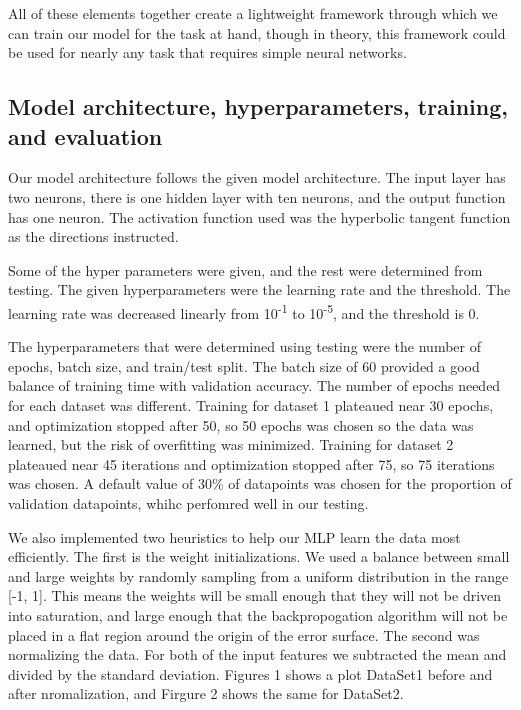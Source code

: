 \documentclass[letterpaper, 12pt]{article}
\begin{document}
All of these elements together create a lightweight framework through which we can train our model for the task at hand, though in theory, this framework could be used for nearly any task that requires simple neural networks.

\subsection{Model architecture, hyperparameters, training, and evaluation}

Our model architecture follows the given model architecture. The input layer has two neurons, there is one hidden layer with ten neurons, and the output function has one neuron. The activation function used was the hyperbolic tangent function as the directions instructed.

Some of the hyper parameters were given, and the rest were determined from testing. The given hyperparameters were the learning rate and the threshold. The learning rate was decreased linearly from 10\textsuperscript{-1} to 10\textsuperscript{-5}, and the threshold is 0.

The hyperparameters that were determined using testing were the number of epochs, batch size, and train/test split.  The batch size of 60 provided a good balance of training time with validation accuracy.  The number of epochs needed for each dataset was different.  Training for dataset 1 plateaued near 30 epochs, and optimization stopped after 50, so 50 epochs was chosen so the data was learned, but the risk of overfitting was minimized.  Training for dataset 2 plateaued near 45 iterations and optimization stopped after 75, so 75 iterations was chosen.  A default value of 30\% of datapoints was chosen  for the proportion of validation datapoints, whihc perfomred well in our testing.

We also implemented two heuristics to help our MLP learn the data most efficiently. The first is the weight initializations. We used a balance between small and large weights by randomly sampling from a uniform distribution in the range [-1, 1]. This means the weights will be small enough that they will not be driven into saturation, and large enough that the backpropogation algorithm will not be placed in a flat region around the origin of the error surface.
The second was normalizing the data.  For both of the input features we subtracted the mean and divided by the standard deviation. Figures 1 shows a plot DataSet1 before and after nromalization, and Firgure 2 shows the same for DataSet2.
\end{document}
